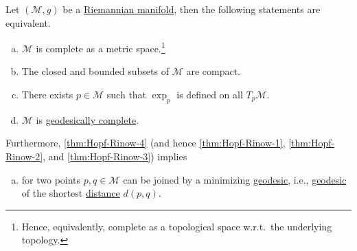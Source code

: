 \begin{theorem}\label{thm:Hopf-Rinow}
	Let \((\mathcal{M} , g)\) be a \hyperref[def:Riemannian-manifold]{Riemannian manifold}, then the following statements are equivalent.
	\begin{enumerate}[(a)]
		\item\label{thm:Hopf-Rinow-1} \(\mathcal{M} \) is complete as a metric space.\footnote{Hence, equivalently, complete as a topological space w.r.t.\ the underlying topology.}
		\item\label{thm:Hopf-Rinow-2} The closed and bounded subsets of \(\mathcal{M} \) are compact.
		\item\label{thm:Hopf-Rinow-3} There exists \(p\in \mathcal{M} \) such that \(\exp _p\) is defined on all \(T_p \mathcal{M} \).
		\item\label{thm:Hopf-Rinow-4} \(\mathcal{M} \) is \hyperref[def:geodesically-complete]{geodesically complete}.
	\end{enumerate}
	Furthermore, \autoref{thm:Hopf-Rinow-4} (and hence \autoref{thm:Hopf-Rinow-1}, \autoref{thm:Hopf-Rinow-2}, and \autoref{thm:Hopf-Rinow-3}) implies
	\begin{enumerate}[(e)]
		\item\label{thm:Hopf-Rinow-5} for two points \(p, q\in \mathcal{M} \) can be joined by a minimizing \hyperref[def:geodesic]{geodesic}, i.e., \hyperref[def:geodesic]{geodesic} of the shortest \hyperref[def:distance]{distance} \(d(p, q)\).
	\end{enumerate}
\end{theorem}
